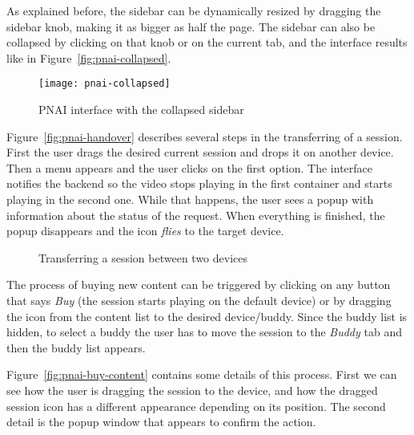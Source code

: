 As explained before, the sidebar can be dynamically resized by dragging the sidebar knob, making it as bigger as half the page.
The sidebar can also be collapsed by clicking on that knob or on the current tab, and the interface results like in Figure~\vref{fig:pnai-collapsed}.

\begin{figure}[htbp]
  \centering
    \texttt{[image: pnai-collapsed]}
  \caption{PNAI interface with the collapsed sidebar}
  \label{fig:pnai-collapsed}
\end{figure}

Figure~\vref{fig:pnai-handover} describes several steps in the transferring of a session.
First the user drags the desired current session and drops it on another device.
Then a menu appears and the user clicks on the first option.
The interface notifies the backend so the video stops playing in the first container and starts playing in the second one.
While that happens, the user sees a popup with information about the status of the request.
When everything is finished, the popup disappears and the icon \emph{flies} to the target device.

\begin{figure}[htbp]
  \centering
  \caption{Transferring a session between two devices}
  \label{fig:pnai-handover}
\end{figure}

The process of buying new content can be triggered by clicking on any button that says \emph{Buy} (the session starts playing on the default device) or by dragging the icon from the content list to the desired device/buddy.
Since the buddy list is hidden, to select a buddy the user has to move the session to the \emph{Buddy} tab and then the buddy list appears.

Figure~\vref{fig:pnai-buy-content} contains some details of this process.
First we can see how the user is dragging the session to the device, and how the dragged session icon has a different appearance depending on its position.
The second detail is the popup window that appears to confirm the action.

